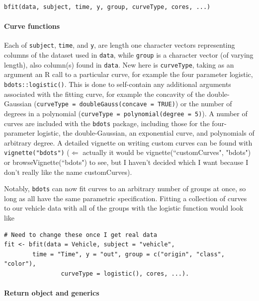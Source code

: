 \documentclass{article}
\newcommand{\xt}{\texttt}%
\begin{document}
\begin{center}
\begin{verbatim}
bfit(data, subject, time, y, group, curveType, cores, ...)
\end{verbatim}
\end{center}

\paragraph{Curve functions} Each of \texttt{subject}, \texttt{time}, and \texttt{y}, are length one character vectors representing columns of the dataset used in \texttt{data}, while \xt{group} is a character vector (of varying length), also column(s) found in \xt{data}. New here is \texttt{curveType}, taking as an argument an R call to a particular curve, for example the four parameter logistic, \texttt{bdots::logistic()}. This is done to self-contain any additional arguments associated with the fitting curve, for example the concavity of the double-Gaussian (\texttt{curveType = doubleGauss(concave = TRUE)}) or the number of degrees in a polynomial (\texttt{curveType = polynomial(degree = 5)}). A number of curves are included with the \texttt{bdots} package, including those for the four-parameter logistic, the double-Gaussian, an exponential curve, and polynomials of arbitrary degree. A detailed vignette on writing custom curves can be found with \texttt{vignette("bdots")} ($\Leftarrow$ actually it would be vignette(``customCurves", "bdots") or browseVignette(``bdots") to see, but I haven't decided which I want because I don't really like the name customCurves).

Notably, \texttt{bdots} can now fit curves to an arbitrary number of groups at once, so long as all have the same parametric specification. Fitting a collection of curves to our vehicle data with all of the groups with the logistic function would look like


\begin{center}
\begin{verbatim}
# Need to change these once I get real data
fit <- bfit(data = Vehicle, subject = "vehicle", 
	 	time = "Time", y = "out", group = c("origin", "class", "color"),
	 			curveType = logistic(), cores, ...).
\end{verbatim}
\end{center}


\paragraph{Return object and generics}
\end{document}
